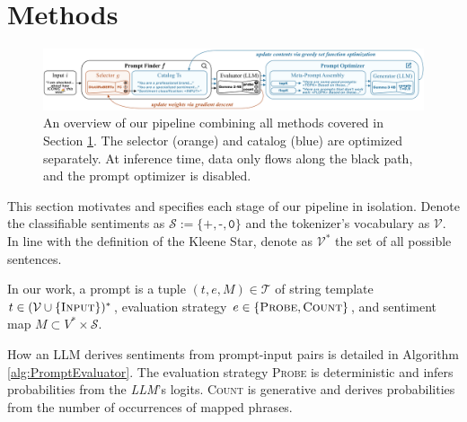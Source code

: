 \documentclass{article}
\theoremstyle{plain}
\theoremstyle{definition}
\theoremstyle{remark}
\begin{document}
\section{Methods}
\label{sec:methods}

\begin{figure}[t]
    \centering
    \includegraphics[width=\linewidth]{TablesFigures/pipeline.pdf}
    \vspace{-3ex}
    \caption{An overview of our pipeline combining all methods covered in Section \ref{sec:methods}. The \textcolor{ourorange}{selector (orange)} and \textcolor{ourblue}{catalog (blue)} are optimized separately. At inference time, data only flows along the black path, and the prompt optimizer is disabled.}
    \label{fig:pipeline}
\end{figure}


This section motivates and specifies each stage of our pipeline in isolation. Denote the classifiable sentiments as $\mathcal{S} := \{\texttt{+}, \texttt{-}, \texttt{0}\}$ and the tokenizer's vocabulary as $\mathcal V$. In line with the definition of the Kleene Star, denote as $\mathcal{V}^*$ the set of all possible sentences.

In our work, a prompt is a tuple $(t, e, M)\in\mathcal T$ of string template $t\in (\mathcal{V}\cup\{\textsc{Input}\})^*$, evaluation strategy $e\in\{\textsc{Probe}, \textsc{Count}\}$, and sentiment map $M \subset {V}^* \times \mathcal{S}$.

How an LLM derives sentiments from prompt-input pairs is detailed in Algorithm \ref{alg:PromptEvaluator}. The evaluation strategy \textsc{Probe} is deterministic and infers probabilities from the \textit{LLM}'s logits. \textsc{Count} is generative and derives probabilities from the number of occurrences of mapped phrases.
\end{document}
